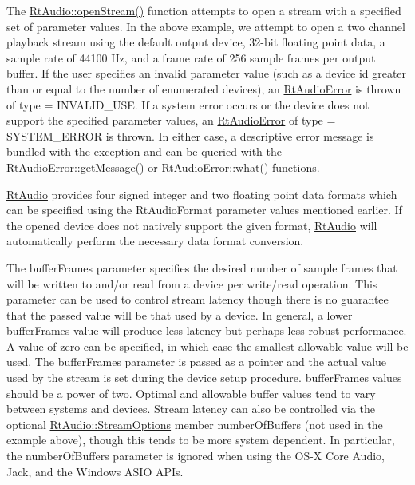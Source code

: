 The \hyperlink{class_rt_audio_a6907539d2527775df778ebce32ef1e3b}{Rt\+Audio\+::open\+Stream()} function attempts to open a stream with a specified set of parameter values. In the above example, we attempt to open a two channel playback stream using the default output device, 32-\/bit floating point data, a sample rate of 44100 Hz, and a frame rate of 256 sample frames per output buffer. If the user specifies an invalid parameter value (such as a device id greater than or equal to the number of enumerated devices), an \hyperlink{class_rt_audio_error}{Rt\+Audio\+Error} is thrown of type = I\+N\+V\+A\+L\+I\+D\+\_\+\+U\+SE. If a system error occurs or the device does not support the specified parameter values, an \hyperlink{class_rt_audio_error}{Rt\+Audio\+Error} of type = S\+Y\+S\+T\+E\+M\+\_\+\+E\+R\+R\+OR is thrown. In either case, a descriptive error message is bundled with the exception and can be queried with the \hyperlink{class_rt_audio_error_af1e84bd3ebc86210a723d1839b4f9cbf}{Rt\+Audio\+Error\+::get\+Message()} or \hyperlink{class_rt_audio_error_aa0a4ebf95bcd3c6a6b1125bd5ad889da}{Rt\+Audio\+Error\+::what()} functions.

\hyperlink{class_rt_audio}{Rt\+Audio} provides four signed integer and two floating point data formats which can be specified using the Rt\+Audio\+Format parameter values mentioned earlier. If the opened device does not natively support the given format, \hyperlink{class_rt_audio}{Rt\+Audio} will automatically perform the necessary data format conversion.

The {\ttfamily buffer\+Frames} parameter specifies the desired number of sample frames that will be written to and/or read from a device per write/read operation. This parameter can be used to control stream latency though there is no guarantee that the passed value will be that used by a device. In general, a lower {\ttfamily buffer\+Frames} value will produce less latency but perhaps less robust performance. A value of zero can be specified, in which case the smallest allowable value will be used. The {\ttfamily buffer\+Frames} parameter is passed as a pointer and the actual value used by the stream is set during the device setup procedure. {\ttfamily buffer\+Frames} values should be a power of two. Optimal and allowable buffer values tend to vary between systems and devices. Stream latency can also be controlled via the optional \hyperlink{struct_rt_audio_1_1_stream_options}{Rt\+Audio\+::\+Stream\+Options} member {\ttfamily number\+Of\+Buffers} (not used in the example above), though this tends to be more system dependent. In particular, the {\ttfamily number\+Of\+Buffers} parameter is ignored when using the O\+S-\/X Core Audio, Jack, and the Windows A\+S\+IO A\+P\+Is.

